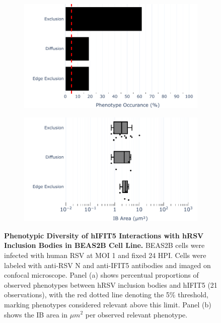 \begin{figure}
    \begin{subfigure}{0.495\textwidth}
        \caption{}
        \includegraphics[width=1\linewidth]{08. Chapter 3/Figs/02. Infection/04. IFIT5/04. bar_i5_beas2b.pdf}
    \end{subfigure}
    \begin{subfigure}{0.495\textwidth}
        \caption{}
        \includegraphics[width=1\linewidth]{08. Chapter 3/Figs/02. Infection/04. IFIT5/05. box_i5_beas2b.pdf}
    \end{subfigure}
    \caption[Phenotypic Diversity of hIFIT5 Interactions with hRSV Inclusion Bodies in BEAS2B Cell Line.]{\textbf{Phenotypic Diversity of hIFIT5 Interactions with hRSV Inclusion Bodies in BEAS2B Cell Line.} BEAS2B cells were infected with human RSV at MOI 1 and fixed 24 HPI. Cells were labeled with anti-RSV N and anti-IFIT5 antibodies and imaged on confocal microscope. Panel (a) shows percentual proportions of observed phenotypes between hRSV inclusion bodies and hIFIT5 (21 observations), with the red dotted line denoting the 5\% threshold, marking phenotypes considered relevant above this limit. Panel (b) shows the IB area in \(\mu m^2\) per observed relevant phenotype.}
    \label{fig:Phenotypic Diversity of hIFIT5 Interactions with hRSV Inclusion Bodies in BEAS2B Cell Line}
\end{figure}

